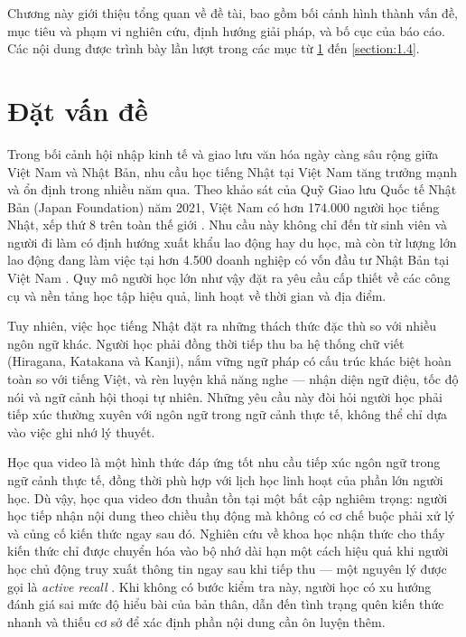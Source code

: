 \documentclass[../DoAn.tex]{subfiles}
\begin{document}
Chương này giới thiệu tổng quan về đề tài, bao gồm bối cảnh hình thành vấn đề, mục tiêu và phạm vi nghiên cứu, định hướng giải pháp, và bố cục của báo cáo. Các nội dung được trình bày lần lượt trong các mục từ \ref{section:1.1} đến \ref{section:1.4}.

\section{Đặt vấn đề}
\label{section:1.1}

Trong bối cảnh hội nhập kinh tế và giao lưu văn hóa ngày càng sâu rộng giữa Việt Nam và Nhật Bản, nhu cầu học tiếng Nhật tại Việt Nam tăng trưởng mạnh và ổn định trong nhiều năm qua. Theo khảo sát của Quỹ Giao lưu Quốc tế Nhật Bản (Japan Foundation) năm 2021, Việt Nam có hơn 174.000 người học tiếng Nhật, xếp thứ 8 trên toàn thế giới \cite{japanfoundation2021}. Nhu cầu này không chỉ đến từ sinh viên và người đi làm có định hướng xuất khẩu lao động hay du học, mà còn từ lượng lớn lao động đang làm việc tại hơn 4.500 doanh nghiệp có vốn đầu tư Nhật Bản tại Việt Nam \cite{jetro2023}. Quy mô người học lớn như vậy đặt ra yêu cầu cấp thiết về các công cụ và nền tảng học tập hiệu quả, linh hoạt về thời gian và địa điểm.

Tuy nhiên, việc học tiếng Nhật đặt ra những thách thức đặc thù so với nhiều ngôn ngữ khác. Người học phải đồng thời tiếp thu ba hệ thống chữ viết (Hiragana, Katakana và Kanji), nắm vững ngữ pháp có cấu trúc khác biệt hoàn toàn so với tiếng Việt, và rèn luyện khả năng nghe — nhận diện ngữ điệu, tốc độ nói và ngữ cảnh hội thoại tự nhiên. Những yêu cầu này đòi hỏi người học phải tiếp xúc thường xuyên với ngôn ngữ trong ngữ cảnh thực tế, không thể chỉ dựa vào việc ghi nhớ lý thuyết.

Học qua video là một hình thức đáp ứng tốt nhu cầu tiếp xúc ngôn ngữ trong ngữ cảnh thực tế, đồng thời phù hợp với lịch học linh hoạt của phần lớn người học. Dù vậy, học qua video đơn thuần tồn tại một bất cập nghiêm trọng: người học tiếp nhận nội dung theo chiều thụ động mà không có cơ chế buộc phải xử lý và củng cố kiến thức ngay sau đó. Nghiên cứu về khoa học nhận thức cho thấy kiến thức chỉ được chuyển hóa vào bộ nhớ dài hạn một cách hiệu quả khi người học chủ động truy xuất thông tin ngay sau khi tiếp thu — một nguyên lý được gọi là \textit{active recall} \cite{roediger2006}. Khi không có bước kiểm tra này, người học có xu hướng đánh giá sai mức độ hiểu bài của bản thân, dẫn đến tình trạng quên kiến thức nhanh và thiếu cơ sở để xác định phần nội dung cần ôn luyện thêm.
\end{document}
